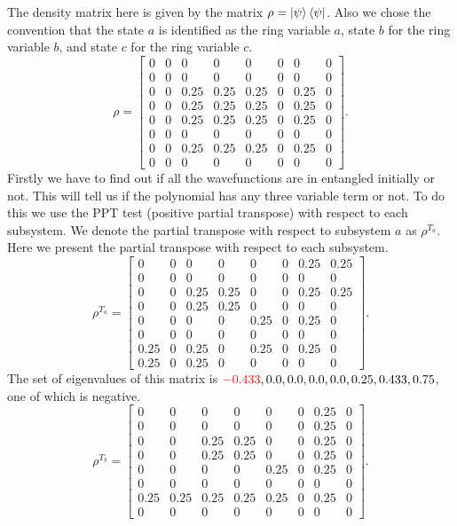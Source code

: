 \documentclass{amsart}
\theoremstyle{plain}
\theoremstyle{definition}
\theoremstyle{plain}
\begin{document}
 	The density matrix here is given by the matrix $\rho = \ket{\psi}\bra{\psi}$. Also we chose the convention that the state $a$ is identified as the ring variable $a$,  state $b$ for the ring variable $b$, and state $c$ for the ring variable $c$.
 	\begin{equation*}
 		\rho = \left[\begin{matrix}0 & 0 & 0 & 0 & 0 & 0 & 0 & 0\\0 & 0 & 0 & 0 & 0 & 0 & 0 & 0\\0 & 0 & 0.25 & 0.25 & 0.25 & 0 & 0.25 & 0\\0 & 0 & 0.25 & 0.25 & 0.25 & 0 & 0.25 & 0\\0 & 0 & 0.25 & 0.25 & 0.25 & 0 & 0.25 & 0\\0 & 0 & 0 & 0 & 0 & 0 & 0 & 0\\0 & 0 & 0.25 & 0.25 & 0.25 & 0 & 0.25 & 0\\0 & 0 & 0 & 0 & 0 & 0 & 0 & 0\end{matrix}\right].
 	\end{equation*}
 	Firstly we have to find out if all the wavefunctions are in entangled initially or not. This will tell us if the polynomial has any three variable term or not. To do this we use the PPT test (positive partial transpose) with respect to each subsystem.
 	We denote the partial transpose with respect to subsystem $a$ as $\rho^{T_a}$. Here we present the partial transpose with respect to each subsystem.
 	\begin{equation*}
 		\rho^{T_a} = \left[\begin{matrix}0 & 0 & 0 & 0 & 0 & 0 & 0.25 & 0.25\\0 & 0 & 0 & 0 & 0 & 0 & 0 & 0\\0 & 0 & 0.25 & 0.25 & 0 & 0 & 0.25 & 0.25\\0 & 0 & 0.25 & 0.25 & 0 & 0 & 0 & 0\\0 & 0 & 0 & 0 & 0.25 & 0 & 0.25 & 0\\0 & 0 & 0 & 0 & 0 & 0 & 0 & 0\\0.25 & 0 & 0.25 & 0 & 0.25 & 0 & 0.25 & 0\\0.25 & 0 & 0.25 & 0 & 0 & 0 & 0 & 0\end{matrix}\right].
 	\end{equation*}
 	The set of eigenvalues of this matrix is $\mathcolor{red}{-0.433}, 0.0, 0.0, 0.0, 0.0, 0.25, 0.433, 0.75$, one of which is negative. 
 	\begin{equation*}
 		\rho^{T_b} = \left[\begin{matrix}0 & 0 & 0 & 0 & 0 & 0 & 0.25 & 0\\0 & 0 & 0 & 0 & 0 & 0 & 0.25 & 0\\0 & 0 & 0.25 & 0.25 & 0 & 0 & 0.25 & 0\\0 & 0 & 0.25 & 0.25 & 0 & 0 & 0.25 & 0\\0 & 0 & 0 & 0 & 0.25 & 0 & 0.25 & 0\\0 & 0 & 0 & 0 & 0 & 0 & 0 & 0\\0.25 & 0.25 & 0.25 & 0.25 & 0.25 & 0 & 0.25 & 0\\0 & 0 & 0 & 0 & 0 & 0 & 0 & 0\end{matrix}\right].
 	\end{equation*}
\end{document}
